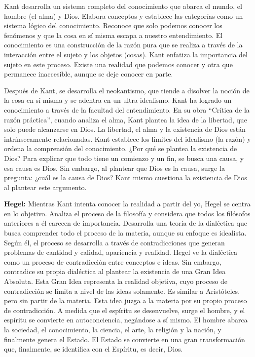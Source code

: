 \documentclass[
  letterpaper,
  DIV=11,
  numbers=noendperiod]{scrartcl}
\begin{document}
Kant desarrolla un sistema completo del conocimiento que abarca el
mundo, el hombre (el alma) y Dios. Elabora conceptos y establece las
categorías como un sistema lógico del conocimiento. Reconoce que solo
podemos conocer los fenómenos y que la cosa en sí misma escapa a nuestro
entendimiento. El conocimiento es una construcción de la razón pura que
se realiza a través de la interacción entre el sujeto y los objetos
(cosas). Kant enfatiza la importancia del sujeto en este proceso. Existe
una realidad que podemos conocer y otra que permanece inaccesible,
aunque se deje conocer en parte.

Después de Kant, se desarrolla el neokantismo, que tiende a disolver la
noción de la cosa en sí misma y se adentra en un ultra-idealismo. Kant
ha logrado un conocimiento a través de la facultad del entendimiento. En
su obra ``Crítica de la razón práctica'', cuando analiza el alma, Kant
plantea la idea de la libertad, que solo puede alcanzarse en Dios. La
libertad, el alma y la existencia de Dios están intrínsecamente
relacionadas. Kant establece los límites del idealismo (la razón) y
ordena la comprensión del conocimiento. ¿Por qué se plantea la
existencia de Dios? Para explicar que todo tiene un comienzo y un fin,
se busca una causa, y esa causa es Dios. Sin embargo, al plantear que
Dios es la causa, surge la pregunta: ¿cuál es la causa de Dios? Kant
mismo cuestiona la existencia de Dios al plantear este argumento.

\textbf{Hegel:} Mientras Kant intenta conocer la realidad a partir del
yo, Hegel se centra en lo objetivo. Analiza el proceso de la filosofía y
considera que todos los filósofos anteriores a él carecen de
importancia. Desarrolla una teoría de la dialéctica que busca comprender
todo el proceso de la materia, aunque su enfoque es idealista. Según él,
el proceso se desarrolla a través de contradicciones que generan
problemas de cantidad y calidad, apariencia y realidad. Hegel ve la
dialéctica como un proceso de contradicción entre conceptos e ideas. Sin
embargo, contradice su propia dialéctica al plantear la existencia de
una Gran Idea Absoluta. Esta Gran Idea representa la realidad objetiva,
cuyo proceso de contradicción se limita a nivel de las ideas solamente.
Es similar a Aristóteles, pero sin partir de la materia. Esta idea juzga
a la materia por su propio proceso de contradicción. A medida que el
espíritu se desenvuelve, surge el hombre, y el espíritu se convierte en
autoconciencia, negándose a sí mismo. El hombre abarca la sociedad, el
conocimiento, la ciencia, el arte, la religión y la nación, y finalmente
genera el Estado. El Estado se convierte en una gran transformación que,
finalmente, se identifica con el Espíritu, es decir, Dios.
\end{document}
